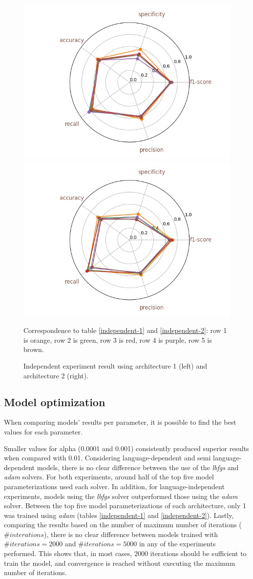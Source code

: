 \begin{figure}[t]
	\begin{center}
		\includegraphics[width=.49\linewidth]{figs/independent_radar.jpg}
		\includegraphics[width=.49\linewidth]{figs/independent_200_radar.jpg}
	\end{center}
	\caption{Independent experiment result using architecture 1 (left) and architecture 2 (right).} Correspondence to table \ref{independent-1} and \ref{independent-2}: row 1 is orange, row 2 is green, row 3 is red, row 4 is purple, row 5 is brown.
	\label{radar_independent}
\end{figure}

\subsection{Model optimization}

When comparing models' results per parameter, it is possible to find the best values for each parameter.

Smaller values for alpha (0.0001 and 0.001) consistently produced superior results when compared with 0.01. Considering language-dependent and semi language-dependent models, there is no clear difference between the use of the \textit{lbfgs} and \textit{adam} solvers. For both experiments, around half of the top five model parameterizations used each solver. In addition, for language-independent experiments, models using the \textit{lbfgs} solver outperformed those using the \textit{adam} solver. Between the top five model parameterizations of each architecture, only 1 was trained using \textit{adam} (tables \ref{independent-1} and \ref{independent-2}). Lastly, comparing the results based on the number of maximum number of iterations ($\#interations$), there is no clear difference between models trained with $\#iterations = 2000$ and $\#iterations = 5000$ in any of the experiments performed. This shows that, in most cases, 2000 iterations should be sufficient to train the model, and convergence is reached without executing the maximum number of iterations.

